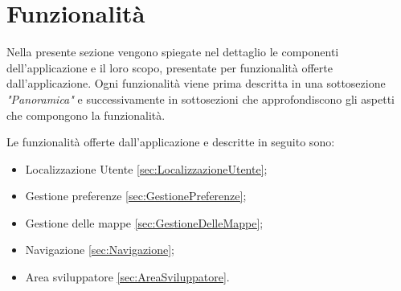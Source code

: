\documentclass[../ManualeSviluppatore.tex]{subfiles}
\begin{document}
\section{Funzionalità}
	Nella presente sezione vengono spiegate nel dettaglio le componenti dell'applicazione e il loro scopo, presentate per funzionalità offerte dall'applicazione.
	Ogni funzionalità viene prima descritta in una sottosezione \textit{"Panoramica"} e successivamente in sottosezioni che approfondiscono gli aspetti che compongono la funzionalità.
	
	Le funzionalità offerte dall'applicazione e descritte in seguito sono:
	\begin{itemize}
		\item Localizzazione Utente \ref{sec:LocalizzazioneUtente};
		\item Gestione preferenze \ref{sec:GestionePreferenze};
		\item Gestione delle mappe \ref{sec:GestioneDelleMappe};
		\item Navigazione \ref{sec:Navigazione};
		\item Area sviluppatore \ref{sec:AreaSviluppatore}.
	\end{itemize}
	
	\newpage
	
	
	\newpage
	
	
	\newpage
	
	
	\newpage
	
	
	\newpage
	
\end{document}

